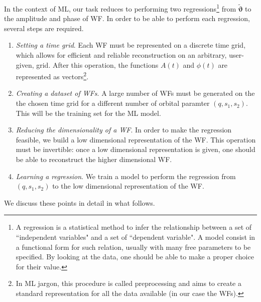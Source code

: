 \par
In the context of ML, our task reduces to performing two regressions\footnote{A regression is a statistical method to infer the relationship between a set of ``independent variables" and a set of ``dependent variable". A model consist in a functional form for such relation, usually with many free parameters to be specified. By looking at the data, one should be able to make a proper choice for their value.} 
from $\tilde{\boldsymbol{\vartheta}}$ to the amplitude and phase of WF. 
In order to be able to perform each regression, several steps are required.

\begin{enumerate}[label=(\Alph*)]
	\item \textit{Setting a time grid}. Each WF must be represented on a discrete time grid, which allows for efficient and reliable reconstruction on an arbitrary, user-given, grid. After this operation, the functions $A(t)$ and $\phi(t)$ are represented as vectors\footnote{
In ML jargon, this procedure is called preprocessing and aims to create a standard representation for all the data available (in our case the WFs).
}.
	\item \textit{Creating a dataset of WFs}. A large number of WFs must be generated on the the chosen time grid for a different number of orbital paramter $(q,s_1,s_2)$. This will be the training set for the ML model.
	\item \textit{Reducing the dimensionality of a WF}. In order to make the regression feasible, we build a low dimensional representation of the WF. This operation must be invertible: once a low dimensional representation is given, one should be able to reconstruct the higher dimensional WF.
	\item \textit{Learning a regression}. We train a model to perform the regression from $(q, s_1, s_2)$ to the low dimensional representation of the WF.
\end{enumerate}
We discuss these points in detail in what follows.

%
